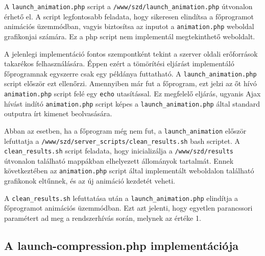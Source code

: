 \documentclass[oneside,titlepage,12pt,a4paper]{report}
\begin{document}
A \texttt{launch\_animation.php} script a \texttt{/www/szd/launch\_animation.php} útvonalon érhető el. A script legfontosabb feladata, hogy sikeresen elindítsa a főprogramot animációs üzemmódban, vagyis biztosítsa az inputot a \texttt{animation.php} weboldal grafikonjai számára. Ez a php script nem implementál megtekinthető weboldalt.
\par A jelenlegi implementáció fontos szempontként tekint a szerver oldali erőforrások takarékos felhasználására. Éppen ezért a tömörítési eljárást implementáló főprogramnak egyszerre csak egy példánya futtatható. A \texttt{launch\_animation.php} script először ezt ellenőrzi. Amennyiben már fut a főprogram, ezt jelzi az őt hívó \texttt{animation.php} script felé egy \texttt{echo} utasítással. Ez megfelelő eljárás, ugyanis Ajax hívást indító \texttt{animation.php} script képes a \texttt{launch\_animation.php} által standard outputra írt kimenet beolvasására. 
\par Abban az esetben, ha a főprogram még nem fut, a \texttt{launch\_animation} először \linebreak lefuttatja a \texttt{/www/szd/server\_scripts/clean\_results.sh} bash scriptet. \linebreak A \texttt{clean\_results.sh} script feladata, hogy inicializálja a \texttt{/www/szd/results} útvonalon található mappákban elhelyezett állományok tartalmát. Ennek következtében az \texttt{animation.php} script által implementált weboldalon található grafikonok eltűnnek, és az új animáció kezdetét veheti.
\par A \texttt{clean\_results.sh} lefuttatása után a \texttt{launch\_animation.php} elindítja a főprogramot animációs üzemmódban. Ezt azt jelenti, hogy egyetlen parancssori paramétert ad meg a rendszerhívás során, melynek az értéke 1.

\subsection{A launch-compression.php implementációja}
\end{document}
